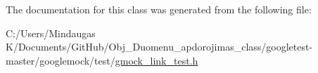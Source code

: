 The documentation for this class was generated from the following file\+:\begin{DoxyCompactItemize}
\item 
C\+:/\+Users/\+Mindaugas K/\+Documents/\+Git\+Hub/\+Obj\+\_\+\+Duomenu\+\_\+apdorojimas\+\_\+class/googletest-\/master/googlemock/test/\mbox{\hyperlink{googletest-master_2googlemock_2test_2gmock__link__test_8h}{gmock\+\_\+link\+\_\+test.\+h}}\end{DoxyCompactItemize}
